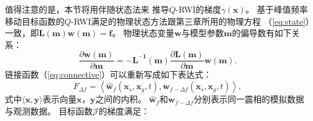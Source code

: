 值得注意的是，本节将用伴随状态法来
推导$Q$-RWI的梯度$\gamma(\mathbf{x})$。
基于峰值频率移动目标函数的$Q$-RWI满足的物理状态方法跟第三章所用的物理方程
（\ref{eq:state}）一致，即$\mathbf{L(m)}\mathbf{w(m)}=\mathbf{f}$。
物理状态变量$\mathbf{w}$与模型参数$\mathbf{m}$的偏导数有如下关系：
\begin{equation}
		\frac{\partial\mathbf{w(m)}}{\partial\mathbf{m}}=
		-\mathbf{L^{-1}(m)}\frac{\partial \mathbf{L(m)}}{\partial\mathbf{m}}\mathbf{w(m)}.
	\label{eq:ad_state}
\end{equation}
链接函数（\ref{eq:connective}）可以重新写成如下表达式：
\begin{equation}
	\dot{F}_{\Delta f}=\left\langle \hat{\mathbf{w}}_f(\mathbf{x}_s,\mathbf{x}_g,t),
	\dot{\mathbf{w}}_{f-\Delta f}(\mathbf{x}_s,\mathbf{x}_g,t) \right\rangle,
\end{equation}
式中$\langle \mathbf{x},\mathbf{y}\rangle$表示向量$\mathbf{x}$，$\mathbf{y}$之间的内积。
$\hat{\mathbf{w}}_f$和$\mathbf{w}_{f-\Delta f}$分别表示同一震相的模拟数据与观测数据。
目标函数$\mathcal{J}$的梯度满足：

